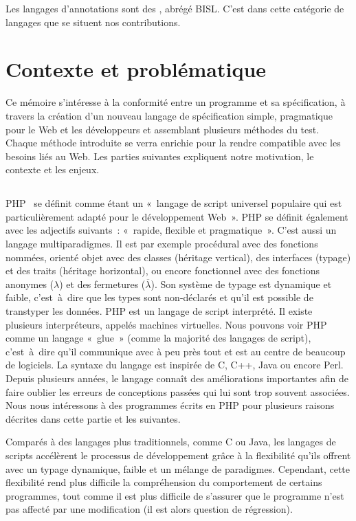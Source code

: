 Les langages d'annotations sont des , abrégé BISL. C'est dans cette catégorie de langages que
se situent nos contributions.

\section{Contexte et problématique}

Ce mémoire s'intéresse à la conformité entre un programme et sa spécification, à
travers la création d'un nouveau langage de spécification simple, pragmatique
pour le Web et les développeurs et assemblant plusieurs méthodes du test. Chaque
méthode introduite se verra enrichie pour la rendre compatible avec les besoins
liés au Web. Les parties suivantes expliquent notre motivation, le contexte et
les enjeux.

\subsection{}

PHP~ se définit comme étant un «~langage de script universel
populaire qui est particulièrement adapté pour le développement Web~». PHP se
définit également avec les adjectifs suivants~: «~rapide, flexible et
pragmatique~». C'est aussi un langage multiparadigmes. Il est par exemple
procédural avec des fonctions nommées, orienté objet avec des classes (héritage
vertical), des interfaces (typage) et des traits (héritage horizontal), ou
encore fonctionnel avec des fonctions anonymes ($\lambda$) et des fermetures
($\overline{\lambda}$). Son système de typage est dynamique et faible,
c'est~à~dire que les types sont non-déclarés et qu'il est possible de transtyper
les données. PHP est un langage de script interprété. Il existe plusieurs
interpréteurs, appelés machines virtuelles. Nous pouvons voir PHP comme un
langage «~glue~» (comme la majorité des langages de script), c'est~à~dire qu'il
communique avec à peu près tout et est au centre de beaucoup de logiciels. La
syntaxe du langage est inspirée de C, C++, Java ou encore Perl.  Depuis
plusieurs années, le langage connaît des améliorations importantes afin de faire
oublier les erreurs de conceptions passées qui lui sont trop souvent associées.
Nous nous intéressons à des programmes écrits en PHP pour plusieurs raisons
décrites dans cette partie et les suivantes.

Comparés à des langages plus traditionnels, comme C ou Java, les langages de
scripts accélèrent le processus de développement grâce à la flexibilité qu'ils
offrent avec un typage dynamique, faible et un mélange de paradigmes. Cependant,
cette flexibilité rend plus difficile la compréhension du comportement de
certains programmes, tout comme il est plus difficile de s'assurer que le
programme n'est pas affecté par une modification (il est alors question de
régression).

